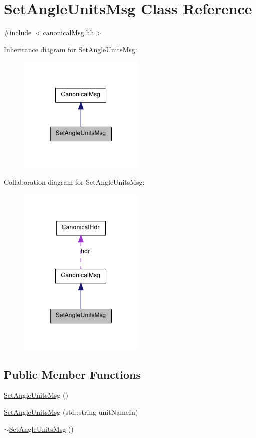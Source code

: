 \hypertarget{class_set_angle_units_msg}{
\section{SetAngleUnitsMsg Class Reference}
\label{class_set_angle_units_msg}
}


{\ttfamily \#include $<$canonicalMsg.hh$>$}



Inheritance diagram for SetAngleUnitsMsg:\nopagebreak
\begin{figure}[H]
\begin{center}
\leavevmode
\includegraphics[width=172pt]{class_set_angle_units_msg__inherit__graph}
\end{center}
\end{figure}


Collaboration diagram for SetAngleUnitsMsg:\nopagebreak
\begin{figure}[H]
\begin{center}
\leavevmode
\includegraphics[width=172pt]{class_set_angle_units_msg__coll__graph}
\end{center}
\end{figure}
\subsection*{Public Member Functions}
\begin{DoxyCompactItemize}
\item 
\hyperlink{class_set_angle_units_msg_a40b4185e6171ce65d7b2b69c83dfb672}{SetAngleUnitsMsg} ()
\item 
\hyperlink{class_set_angle_units_msg_a38d060ce5830db02012d4ab8ce0b9ad6}{SetAngleUnitsMsg} (std::string unitNameIn)
\item 
\hyperlink{class_set_angle_units_msg_ab2e23f4775fa4e8c14dbf0fa4a017ee0}{$\sim$SetAngleUnitsMsg} ()
\end{DoxyCompactItemize}
